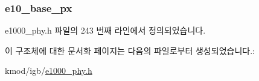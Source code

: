 \subsubsection[{\texorpdfstring{e10\+\_\+base\+\_\+px}{e10_base_px}}]{ e10\+\_\+base\+\_\+px}\hypertarget{structsfp__e1000__flags_aab014944817e542016fa3c9b9b56c829}{}\label{structsfp__e1000__flags_aab014944817e542016fa3c9b9b56c829}


e1000\+\_\+phy.\+h 파일의 243 번째 라인에서 정의되었습니다.



이 구조체에 대한 문서화 페이지는 다음의 파일로부터 생성되었습니다.\+:\begin{DoxyCompactItemize}
\item 
kmod/igb/\hyperlink{e1000__phy_8h}{e1000\+\_\+phy.\+h}\end{DoxyCompactItemize}
